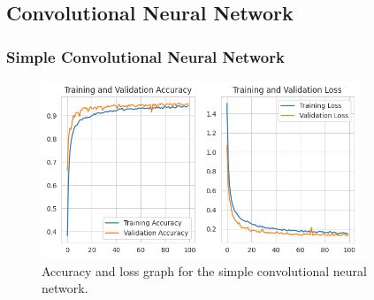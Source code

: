 \subsection{Convolutional Neural Network}\label{subsec:convolutional-neural-network}

\subsubsection{Simple Convolutional Neural Network}

\begin{figure}[ht]
    \centering
    \includegraphics[width=0.85\textwidth]{./img/cnn/simple/accuracy-loss-graph}
    \caption{Accuracy and loss graph for the simple convolutional neural network.}
    \label{fig:cnn-simple-accuracy-loss-graph}
\end{figure}

